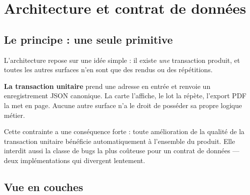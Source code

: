 \chapter{Architecture et contrat de données}
\label{ch:architecture}

\section{Le principe : une seule primitive}

L'architecture repose sur une idée simple : il existe \emph{une} transaction
produit, et toutes les autres surfaces n'en sont que des rendus ou des
répétitions.

\begin{encadre}
\textbf{La transaction unitaire}  prend une
adresse en entrée et renvoie un enregistrement JSON canonique. La carte
l'affiche, le lot la répète, l'export PDF la met en page. Aucune autre surface
n'a le droit de posséder sa propre logique métier.
\end{encadre}

Cette contrainte a une conséquence forte : toute amélioration de la qualité de
la transaction unitaire bénéficie automatiquement à l'ensemble du produit. Elle
interdit aussi la classe de bugs la plus coûteuse pour un contrat de données —
deux implémentations qui divergent lentement.

\section{Vue en couches}

